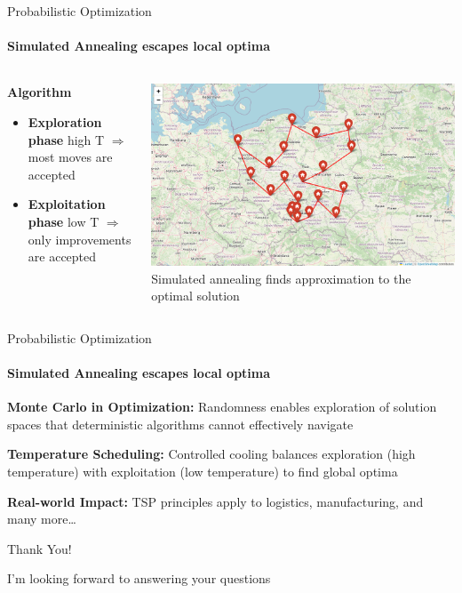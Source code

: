 \documentclass{beamer}
\begin{document}
\begin{frame}{Probabilistic Optimization}
  \framesubtitle{Simulated Annealing escapes local optima}
  \begin{columns}[c]
    \begin{column}{0.4\textwidth}
      \textbf{Algorithm}
      \begin{itemize}
        \item \textbf{Exploration phase} high T $\Rightarrow$ most moves are accepted
        \item \textbf{Exploitation phase} low T $\Rightarrow$ only improvements are accepted
      \end{itemize}
    \end{column}
    \begin{column}{0.6\textwidth}
      \begin{center}
        \includegraphics[width=\textwidth]{images/tsp-annealing.png}
        \\[0.2cm]
        \small{Simulated annealing finds approximation to the optimal solution}
      \end{center}
    \end{column}
  \end{columns}
\end{frame}

\begin{frame}{Probabilistic Optimization}
  \framesubtitle{Simulated Annealing escapes local optima}

  \textbf{Monte Carlo in Optimization:} Randomness enables exploration of solution
  spaces that deterministic algorithms cannot effectively navigate

  \vspace{0.5cm}

  \textbf{Temperature Scheduling:} Controlled cooling balances exploration
  (high temperature) with exploitation (low temperature) to find global optima

  \vspace{0.5cm}

  \textbf{Real-world Impact:} TSP principles apply to logistics, manufacturing,
  and many more\dots

  \vspace{0.5cm}
\end{frame}

\begin{frame}{Thank You!}
  \begin{center}
    \Large{I'm looking forward to answering your questions}
  \end{center}
\end{frame}
\end{document}
